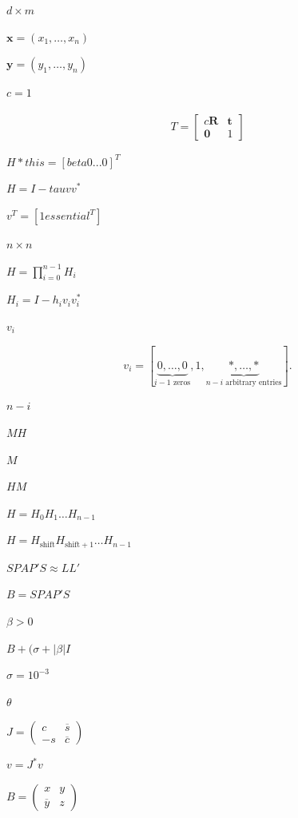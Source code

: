 \documentclass{article}
\begin{document}
$d \times m$
\pagebreak

$ \mathbf{x} = \left( x_1, \hdots, x_n \right) $
\pagebreak

$ \mathbf{y} = \left( y_1, \hdots, y_n \right) $
\pagebreak

$ c=1 $
\pagebreak

\begin{align*}  T = \begin{bmatrix} c\mathbf{R} & \mathbf{t} \\ \mathbf{0} & 1 \end{bmatrix}
\end{align*}
\pagebreak

$ H *this = [ beta 0 ... 0]^T $
\pagebreak

$ H = I - tau v v^*$
\pagebreak

$ v^T = [1 essential^T] $
\pagebreak

$ n \times n $
\pagebreak

$ H = \prod_{i=0}^{n-1} H_i $
\pagebreak

$ H_i = I - h_i v_i
v_i^* $
\pagebreak

$v_i $
\pagebreak

\[v_i = [\underbrace{0, \ldots, 0}_{i-1\mbox{ zeros}}, 1, \underbrace{*, \ldots,*}_{n-i\mbox{ arbitrary entries}} ].
\]
\pagebreak

$ n-i $
\pagebreak

$ MH $
\pagebreak

$ M $
\pagebreak

$ HM $
\pagebreak

$ H = H_0 H_1 \ldots H_{n-1} $
\pagebreak

$ H = H_{\mathrm{shift}}
H_{\mathrm{shift}+1} \ldots H_{n-1} $
\pagebreak

$ S P A P' S \approx L L' $
\pagebreak

$ B = S P A P' S $
\pagebreak

$ \beta > 0 $
\pagebreak

$ B + (\sigma+|\beta| I $
\pagebreak

$ \sigma = 10^{-3} $
\pagebreak

$ \theta $
\pagebreak

$ J = \left ( \begin{array}{cc} c & \overline s \\ -s  & \overline c \end{array} \right ) $
\pagebreak

$ v = J^* v $
\pagebreak

$ B = \left ( \begin{array}{cc} x & y \\ \overline y & z \end{array} \right )$
\pagebreak
\end{document}
